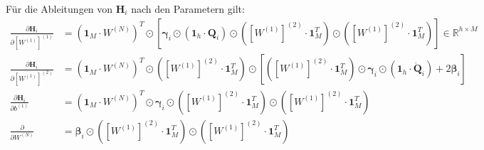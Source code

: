 \documentclass[a4paper, 12pt]{scrartcl}
\begin{document}
Für die Ableitungen von $\bm{H}_i$ nach den Parametern gilt: 
\begin{align*}
    \frac{\partial \bm{H}_i}{\partial \left[W^{(1)}\right]^{(1)}}
    &=
    \left(
        \bm{1}_M \cdot W^{(N)} 
    \right)^T
    \odot
    \left[
        \bm{\gamma}_i
        \odot
        \left(\bm{1}_h \cdot \bm{Q}_i\right)
        \odot
        \left(        
            \left[W^{(1)}\right]^{(2)} \cdot \bm{1}_M^T
        \right)
        \odot 
        \left(
            \left[W^{(1)}\right]^{(2)} \cdot \bm{1}_M^T
        \right)
    \right]
    \in \mathbb{R}^{h \times M}
    \\
    \frac{\partial \bm{H}_i}{\partial \left[W^{(1)}\right]^{(2)}}
    &=
    \left(
        \bm{1}_M \cdot W^{(N)}
    \right)^T
    \odot 
    \left(\left[W^{(1)} \right]^{(2)} \cdot \bm{1}_M^T \right)
    \odot
    \left[
        \left(\left[W^{(1)}\right]^{(2)} \cdot \bm{1}_M^T\right)
        \odot
        \bm{\gamma}_i 
        \odot
        \left(
            \bm{1}_h \cdot \bm{\dot{Q}}_i
        \right)
        + 2\bm{\beta}_i
    \right]
    \\
    \frac{\partial \bm{H}_i}{\partial b^{(1)}}
    &=
    \left(\bm{1}_M \cdot W^{(N)}\right)^T
    \odot
    \bm{\gamma}_i 
    \odot 
    \left(\left[W^{(1)}\right]^{(2)} \cdot \bm{1}_M^T\right)
    \odot
    \left(\left[W^{(1)}\right]^{(2)} \cdot \bm{1}_M^T\right)
    \\
    \frac{\partial }{\partial W^{(N)}}
    &=
    \bm{\beta}_i
    \odot
    \left(\left[W^{(1)}\right]^{(2)} \cdot \bm{1}_M^T\right)
    \odot
    \left(\left[W^{(1)}\right]^{(2)} \cdot \bm{1}_M^T\right)
\end{align*}
\end{document}
